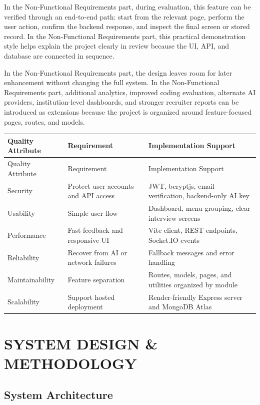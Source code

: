 \documentclass[12pt,a4paper]{report}
\begin{document}
In the Non-Functional Requirements part, during evaluation, this feature can be verified through an end-to-end path: start from the relevant page, perform the user action, confirm the backend response, and inspect the final screen or stored record. In the Non-Functional Requirements part, this practical demonstration style helps explain the project clearly in review because the UI, API, and database are connected in sequence.


In the Non-Functional Requirements part, the design leaves room for later enhancement without changing the full system. In the Non-Functional Requirements part, additional analytics, improved coding evaluation, alternate AI providers, institution-level dashboards, and stronger recruiter reports can be introduced as extensions because the project is organized around feature-focused pages, routes, and models.


\begin{longtable}{|>{\raggedright\arraybackslash}p{}|>{\raggedright\arraybackslash}p{}|>{\raggedright\arraybackslash}p{}|}
\hline
Quality Attribute & Requirement & Implementation Support \\
\hline
\endfirsthead
\hline
Quality Attribute & Requirement & Implementation Support \\
\hline
\endhead
Security & Protect user accounts and API access & JWT, bcryptjs, email verification, backend-only AI key \\
\hline
Usability & Simple user flow & Dashboard, menu grouping, clear interview screens \\
\hline
Performance & Fast feedback and responsive UI & Vite client, REST endpoints, Socket.IO events \\
\hline
Reliability & Recover from AI or network failures & Fallback messages and error handling \\
\hline
Maintainability & Feature separation & Routes, models, pages, and utilities organized by module \\
\hline
Scalability & Support hosted deployment & Render-friendly Express server and MongoDB Atlas \\
\hline
\end{longtable}

\chapter{SYSTEM DESIGN \& METHODOLOGY}

\section{System Architecture}
\end{document}
